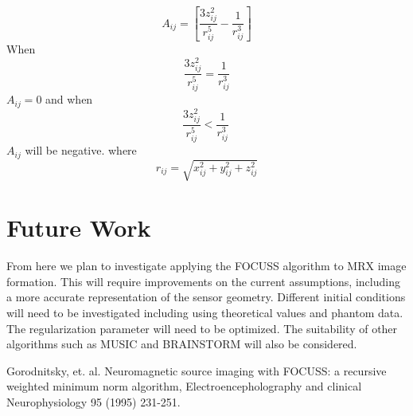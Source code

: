 \documentclass[a4paper]{article}
\begin{document}
\begin{equation} \label{eq:Amatrix}
A_{ij} = \left[\frac{3z_{ij}^{2}}{r_{ij}^{5}} - \frac{1}{r_{ij}^{3}}\right]
\end{equation}
When \[ \frac{3z_{ij}^{2}}{r_{ij}^{5}} = \frac{1}{r_{ij}^{3}}\] $A_{ij}=0$ and when \[ \frac{3z_{ij}^{2}}{r_{ij}^{5}} < \frac{1}{r_{ij}^{3}}\ \] $A_{ij}$ will be negative.
where \[r_{ij} = \sqrt{x_{ij}^{2}+y_{ij}^{2}+z_{ij}^2}\]

\section{Future Work}

From here we plan to investigate applying the FOCUSS algorithm to MRX image formation.  This will require improvements on the current assumptions, including a more accurate representation of the sensor geometry.  Different initial conditions will need to be investigated including using theoretical values and phantom data.  The regularization parameter will need to be optimized. The suitability of other algorithms such as MUSIC and BRAINSTORM will also be considered.


\begin{thebibliography}{2}
 Gorodnitsky, et. al. Neuromagnetic source imaging with FOCUSS: a recursive weighted minimum norm algorithm, Electroencepholography and clinical Neurophysiology 95 (1995) 231-251.
\end{thebibliography}
\end{document}
